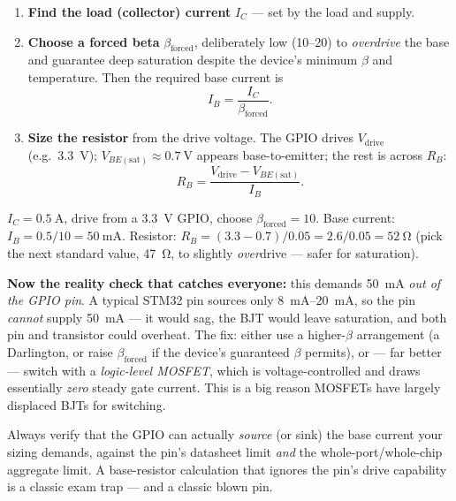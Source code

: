 \documentclass[11pt,a4paper,oneside]{book}
\begin{document}
\begin{enumerate}[leftmargin=1.5cm]
  \item \textbf{Find the load (collector) current} $I_C$ --- set by the load and
        supply.
  \item \textbf{Choose a forced beta} $\beta_{\text{forced}}$, deliberately low
        (\numrange{10}{20}) to \emph{overdrive} the base and guarantee deep
        saturation despite the device's minimum $\beta$ and temperature. Then the
        required base current is
        \[ I_B = \frac{I_C}{\beta_{\text{forced}}}. \]
  \item \textbf{Size the resistor} from the drive voltage. The GPIO drives
        $V_{\text{drive}}$ (e.g.\ \qty{3.3}{\volt}); $V_{BE(\text{sat})}\approx
        \qty{0.7}{\volt}$ appears base-to-emitter; the rest is across $R_B$:
        \[ R_B = \frac{V_{\text{drive}} - V_{BE(\text{sat})}}{I_B}. \]
\end{enumerate}

\begin{wexample}
$I_C=\qty{0.5}{\ampere}$, drive from a \qty{3.3}{\volt} GPIO, choose
$\beta_{\text{forced}}=10$.
Base current: $I_B = 0.5/10 = \qty{50}{\milli\ampere}$.
Resistor: $R_B = (3.3 - 0.7)/0.05 = 2.6/0.05 = \qty{52}{\ohm}$ (pick the next
standard value, \qty{47}{\ohm}, to slightly \emph{over}drive --- safer for
saturation).

\textbf{Now the reality check that catches everyone:} this demands
\qty{50}{\milli\ampere} \emph{out of the GPIO pin}. A typical STM32 pin sources
only \qtyrange{8}{20}{\milli\ampere}, so the pin \emph{cannot} supply
\qty{50}{\milli\ampere} --- it would sag, the BJT would leave saturation, and
both pin and transistor could overheat. The fix: either use a higher-$\beta$
arrangement (a Darlington, or raise $\beta_{\text{forced}}$ if the device's
guaranteed $\beta$ permits), or --- far better --- switch with a
\emph{logic-level MOSFET}, which is voltage-controlled and draws essentially
\emph{zero} steady gate current. This is a big reason MOSFETs have largely
displaced BJTs for switching.
\end{wexample}

\begin{warning}
Always verify that the GPIO can actually \emph{source} (or sink) the base current
your sizing demands, against the pin's datasheet limit \emph{and} the
whole-port/whole-chip aggregate limit. A base-resistor calculation that ignores
the pin's drive capability is a classic exam trap --- and a classic blown pin.
\end{warning}
\end{document}
